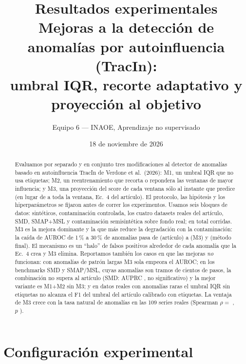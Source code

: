 \documentclass[10pt,a4paper]{article}
\title{Resultados experimentales\\[2pt]\large Mejoras a la detección de anomalías por autoinfluencia (TracIn):\\
umbral IQR, recorte adaptativo y proyección al objetivo}
\author{Equipo 6 --- INAOE, Aprendizaje no supervisado}
\date{18 de noviembre de 2026}
\newcommand{\MI}{M1}\newcommand{\MII}{M2}\newcommand{\MIII}{M3}
\begin{document}
\maketitle

\begin{abstract}
Evaluamos por separado y en conjunto tres modificaciones al detector de anomalías basado en autoinfluencia
TracIn de Verdone et al.\ (2026): \MI, un umbral IQR que no usa etiquetas; \MII, un reentrenamiento que recorta
o repondera las ventanas de mayor influencia; y \MIII, una proyección del score de cada ventana sólo al instante
que predice (en lugar de a toda la ventana, Ec.~4 del artículo). El protocolo, las hipótesis y los
hiperparámetros se fijaron antes de correr los experimentos. Usamos seis bloques de datos: sintéticos,
contaminación controlada, los cuatro datasets reales del artículo, SMD, SMAP+MSL y contaminación semisintética
sobre fondo real; en total  corridas.
\MIII{} es la mejora dominante y la que más reduce la degradación con la contaminación: la caída de AUROC
de 1\,\% a 30\,\% de anomalías pasa de  (artículo) a  (\MIII{}) y
 (método final). El mecanismo es un ``halo'' de falsos positivos alrededor de cada
anomalía que la Ec.~4 crea y \MIII{} elimina. Reportamos también los casos en que las mejoras \emph{no}
funcionan: con anomalías de patrón largas \MIII{} sola empeora el AUROC; en los benchmarks SMD y SMAP/MSL,
cuyas anomalías son tramos de cientos de pasos, la combinación no supera al artículo (SMD: AUPRC
, no significativo) y la mejor variante es \MI+\MII{} sin \MIII{}; y en datos reales con
anomalías raras el umbral IQR sin etiquetas no alcanza el F1 del umbral del artículo calibrado con etiquetas.
La ventaja de \MIII{} crece con la tasa natural de anomalías en las 109 series reales (Spearman
$\rho=$ , $p$ ).
\end{abstract}

\section{Configuración experimental}
\end{document}
